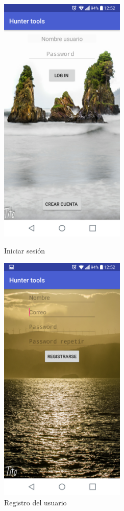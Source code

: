 \begin{figure}[htbp]
\begin{minipage}[b]{0.5\linewidth} %
\centering
\includegraphics[width=6cm]{capturamovil/login.png}

\caption{Iniciar sesión }
\label{fig:login}
\end{minipage}
\hspace{0.5cm} %
\begin{minipage}[b]{0.5\linewidth}
\centering
\includegraphics[width=6cm]{capturamovil/registro.png}

\caption{Registro del usuario }
\label{fig:registro}
\end{minipage}
\end{figure}
